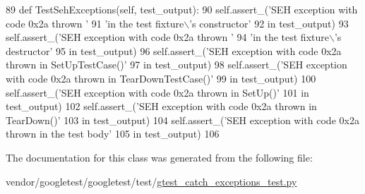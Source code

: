\begin{DoxyCode}
89     \textcolor{keyword}{def }TestSehExceptions(self, test\_output):
90       self.assert\_(\textcolor{stringliteral}{'SEH exception with code 0x2a thrown '}
91                    \textcolor{stringliteral}{'in the test fixture\(\backslash\)'s constructor'}
92                    \textcolor{keywordflow}{in} test\_output)
93       self.assert\_(\textcolor{stringliteral}{'SEH exception with code 0x2a thrown '}
94                    \textcolor{stringliteral}{'in the test fixture\(\backslash\)'s destructor'}
95                    \textcolor{keywordflow}{in} test\_output)
96       self.assert\_(\textcolor{stringliteral}{'SEH exception with code 0x2a thrown in SetUpTestCase()'}
97                    \textcolor{keywordflow}{in} test\_output)
98       self.assert\_(\textcolor{stringliteral}{'SEH exception with code 0x2a thrown in TearDownTestCase()'}
99                    \textcolor{keywordflow}{in} test\_output)
100       self.assert\_(\textcolor{stringliteral}{'SEH exception with code 0x2a thrown in SetUp()'}
101                    \textcolor{keywordflow}{in} test\_output)
102       self.assert\_(\textcolor{stringliteral}{'SEH exception with code 0x2a thrown in TearDown()'}
103                    \textcolor{keywordflow}{in} test\_output)
104       self.assert\_(\textcolor{stringliteral}{'SEH exception with code 0x2a thrown in the test body'}
105                    \textcolor{keywordflow}{in} test\_output)
106 
\end{DoxyCode}


The documentation for this class was generated from the following file\+:\begin{DoxyCompactItemize}
\item 
vendor/googletest/googletest/test/\hyperlink{gtest__catch__exceptions__test_8py}{gtest\+\_\+catch\+\_\+exceptions\+\_\+test.\+py}\end{DoxyCompactItemize}
